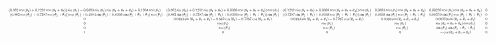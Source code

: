 \documentclass[journal]{new-aiaa}
\begin{document}
\begin{description}
    \[
        \resizebox{\textwidth}{!}{$
        \begin{matrix}\left(0.862 \cos{\left(\theta_{2} \right)} + 0.7287 \cos{\left(\theta_{2} + \theta_{3} \right)}\right) \sin{\left(\theta_{1} \right)} - 0.0393 \sin{\left(\theta_{1} \right)} \sin{\left(\theta_{2} + \theta_{3} + \theta_{4} \right)} + 0.1984 \cos{\left(\theta_{1} \right)} & \left(0.862 \sin{\left(\theta_{2} \right)} + 0.7287 \sin{\left(\theta_{2} + \theta_{3} \right)} + 0.0393 \cos{\left(\theta_{2} + \theta_{3} + \theta_{4} \right)}\right) \cos{\left(\theta_{1} \right)} & \left(0.7287 \sin{\left(\theta_{2} + \theta_{3} \right)} + 0.0393 \cos{\left(\theta_{2} + \theta_{3} + \theta_{4} \right)}\right) \cos{\left(\theta_{1} \right)} & 0.0393 \cos{\left(\theta_{1} \right)} \cos{\left(\theta_{2} + \theta_{3} + \theta_{4} \right)} & 0.00259 \cos{\left(\theta_{1} \right)} \cos{\left(\theta_{2} + \theta_{3} + \theta_{4} \right)} & 0\\- \left(0.862 \cos{\left(\theta_{2} \right)} + 0.7287 \cos{\left(\theta_{2} + \theta_{3} \right)}\right) \cos{\left(\theta_{1} \right)} + 0.1984 \sin{\left(\theta_{1} \right)} + 0.0393 \sin{\left(\theta_{2} + \theta_{3} + \theta_{4} \right)} \cos{\left(\theta_{1} \right)} & \left(0.862 \sin{\left(\theta_{2} \right)} + 0.7287 \sin{\left(\theta_{2} + \theta_{3} \right)} + 0.0393 \cos{\left(\theta_{2} + \theta_{3} + \theta_{4} \right)}\right) \sin{\left(\theta_{1} \right)} & \left(0.7287 \sin{\left(\theta_{2} + \theta_{3} \right)} + 0.0393 \cos{\left(\theta_{2} + \theta_{3} + \theta_{4} \right)}\right) \sin{\left(\theta_{1} \right)} & 0.0393 \sin{\left(\theta_{1} \right)} \cos{\left(\theta_{2} + \theta_{3} + \theta_{4} \right)} & 0.00259 \sin{\left(\theta_{1} \right)} \cos{\left(\theta_{2} + \theta_{3} + \theta_{4} \right)} & 0\\0 & 0.0393 \sin{\left(\theta_{2} + \theta_{3} + \theta_{4} \right)} - 0.862 \cos{\left(\theta_{2} \right)} - 0.7287 \cos{\left(\theta_{2} + \theta_{3} \right)} & 0.0393 \sin{\left(\theta_{2} + \theta_{3} + \theta_{4} \right)} - 0.7287 \cos{\left(\theta_{2} + \theta_{3} \right)} & 0.0393 \sin{\left(\theta_{2} + \theta_{3} + \theta_{4} \right)} & 0.00259 \sin{\left(\theta_{2} + \theta_{3} + \theta_{4} \right)} & 0\\0 & \sin{\left(\theta_{1} \right)} & \sin{\left(\theta_{1} \right)} & \sin{\left(\theta_{1} \right)} & \sin{\left(\theta_{2} + \theta_{3} + \theta_{4} \right)} \cos{\left(\theta_{1} \right)} & 0\\0 & - \cos{\left(\theta_{1} \right)} & - \cos{\left(\theta_{1} \right)} & - \cos{\left(\theta_{1} \right)} & \sin{\left(\theta_{1} \right)} \sin{\left(\theta_{2} + \theta_{3} + \theta_{4} \right)} & 0\\1 & 0 & 0 & 0 & - \cos{\left(\theta_{2} + \theta_{3} + \theta_{4} \right)} & 0\end{matrix}
        $}
    \]


\end{description}
\end{document}
